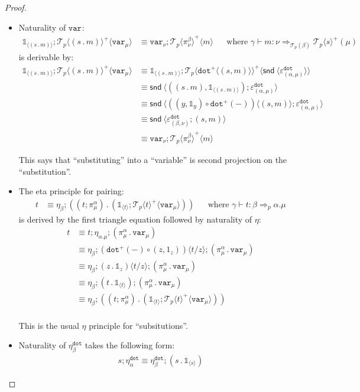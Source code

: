 \documentclass[10pt]{article}
\theoremstyle{definition}
\newcommand\dsd[1]{\ensuremath{\mathsf{#1}}}
\newcommand{\tcell}{\Rightarrow}
\newcommand{\app}[2]{\ensuremath{#1 \: #2}}
\newcommand{\snd}[1]{\app{\dsd{snd}}{#1}}
\newcommand\TermTwoT[5]{\ensuremath{#1 \vdash {#2} : #3 \tcell_{#5} #4}}
\newcommand\TrPlus[2]{\ensuremath{{#1}^+(#2)}}
\newcommand\El[2]{\mathcal{T}_{#1}(#2)}
\newcommand\ApEl[2]{\mathcal{T}_{#1}\langle#2\rangle}
\newcommand\bdot[0]{\mathbin{.}}
\newcommand\ap[2]{\ensuremath{#1 \langle #2 \rangle }}
\newcommand\ApPlus[2]{\ensuremath{{#1}^+ \langle #2 \rangle }}
\newcommand{\tdot}{\ensuremath{\mathtt{dot}}}
\newcommand\One{\ensuremath{\mathds{1}}}
\newcommand\var[1]{\ensuremath{\mathtt{var}_{#1}}}
\newcommand\ApOne[1]{\ensuremath{\One_{\langle {#1} \rangle }}}
\begin{document}
\begin{proof}
\begin{itemize}
\item Naturality of $\var{}$:
\begin{align}
\label{beta-var}
\ApOne{(s \bdot m)};\ApPlus{\ApEl{p}{(s \bdot m)}}{\var{\mu}} &\equiv \var{\nu};\ApPlus{\ApEl{p}{\pi^\beta_\nu}}{m}  && \text{where } \TermTwoT{\gamma}{m}{\nu}{\TrPlus{\ApEl{p}{s}}{\mu}}{\El{p}{\beta}}
\end{align}
is derivable by:
\begin{align*}
\ApOne{(s \bdot m)};\ApPlus{\ApEl{p}{(s \bdot m)}}{\var{\mu}} 
&\equiv \ApOne{(s \bdot m)};\ApPlus{\ApEl{p}{\ApPlus{\tdot}{(s, m)}}}{\ap \snd {\varepsilon^\tdot_{(\alpha, \mu)}}} \\
&\equiv \ap \snd {((s \bdot m), \ApOne{(s \bdot m)});\varepsilon^\tdot_{(\alpha, \mu)}} \\
&\equiv \ap \snd {\ap{ ((y,\One_y) \circ \TrPlus{\tdot}{-})}{(s, m)};\varepsilon^\tdot_{(\alpha, \mu)}} \\
&\equiv \ap \snd {\varepsilon^\tdot_{(\beta, \nu)};(s, m)} \\
&\equiv \var{\nu}; \ApPlus{\ApEl{p}{\pi^\beta_{\nu}}}{m} 
\end{align*}

This says that ``substituting'' into a ``variable'' is second projection
on the ``substitution''.

\item The eta principle for pairing:
\begin{align}
\label{eta-pi-var}
t &\equiv \eta_\beta;((t;\pi_\mu^\alpha) \bdot (\ApOne{t}; \ApPlus{\ApEl{p}{t}}{\var{\mu}})) && \text{where } \TermTwoT{\gamma}{t}{\beta}{\alpha.\mu}{p}
\end{align}
is derived by the first triangle equation followed by naturality of $\eta$:
\begin{align*}
t &\equiv t;\eta_{\alpha.\mu};(\pi_\mu^\alpha \bdot \var{\mu}) \\
&\equiv \eta_\beta;\ap{  (\TrPlus{\tdot}{-} \circ (z,1_z)) }{t/z};(\pi_\mu^\alpha \bdot \var{\mu}) \\
&\equiv \eta_\beta;\ap{(z \bdot \One_z)}{t/z};(\pi_\mu^\alpha \bdot \var{\mu}) \\
&\equiv \eta_\beta;(t \bdot \ApOne{t});(\pi_\mu^\alpha \bdot \var{\mu}) \\
&\equiv \eta_\beta;((t;\pi_\mu^\alpha) \bdot (\ApOne{t}; \ApPlus{\ApEl{p}{t}}{\var{\mu}})) \\
\end{align*}

This is the usual $\eta$ principle for ``subsitutions''.

\item Naturality of $\eta^\tdot_\beta$ takes the following form:
\begin{align*}
s;\eta^\tdot_\alpha \equiv \eta^\tdot_{\beta} ; (s \bdot \ApOne{s})
\end{align*}


\end{itemize}
\end{proof}
\end{document}
